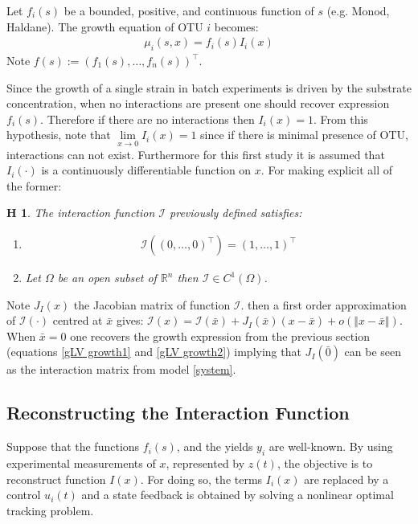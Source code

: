 \documentclass[3p,times]{elsarticle}
\newcommand{\R}{\mathbb{R}}
\newcommand{\I}{\mathcal{I}}
\newtheorem{hypo}{H}
\begin{document}
	Let $f_i(s)$ be a bounded, positive, and continuous function of $s$ (e.g. Monod, Haldane). The growth equation of OTU $i$ becomes:
	\begin{align}
	\mu_i(s,x) = f_i(s)I_i(x)
	\end{align}
	Note $f(s) := (f_1(s),\dots,f_n(s))^\top$.
	\label{growthForm}

Since the growth of a single strain in batch experiments is driven by the substrate concentration, when no interactions are present one should recover expression $f_i(s)$. Therefore if there are no interactions then $I_i(x) = 1$. From this hypothesis, note that $ \lim \limits_{x \rightarrow 0} I_i(x) = 1$ since if there is minimal presence of OTU, interactions can not exist. Furthermore for this first study it is assumed that $I_i(\cdot)$ is a continuously differentiable function on $x$. For making explicit all of the former:

\begin{hypo}
	The interaction function $\I$ previously defined satisfies:
	\begin{enumerate}
		\item\begin{align}
		\I \left( (0,\dots,0)^\top \right) = 
		(1,\dots,1)^\top 
		\end{align}
		\item Let $\Omega$ be an open subset of $ \R^n $ then $\I \in C^1(\Omega)$.
	\end{enumerate} 
\end{hypo}


Note $J_I(x)$ the Jacobian matrix of function $\mathcal{I}$. then a first order approximation of $\I(\cdot)$ centred at $\bar{x}$ gives: $\I(x) = \I(\bar{x}) + J_I(\bar{x})(x-\bar{x}) + o(\Vert x- \bar{x} \Vert)$. When $\bar{x}= 0$ one recovers the growth expression from the previous section (equations \eqref{gLV growth1} and \eqref{gLV growth2}) implying that $J_I(\bar{0})$ can be seen as the interaction matrix from model \eqref{system}.

\subsection{Reconstructing the Interaction Function}

Suppose that the functions $f_i(s)$, and the yields $y_i$ are well-known. By using experimental measurements of $x$, represented by $z(t)$, the objective is to reconstruct function $I(x)$. For doing so, the terms $I_i(x)$ are replaced by a control $u_i(t)$  and a state feedback is obtained by solving a nonlinear optimal tracking problem.	
\end{document}
